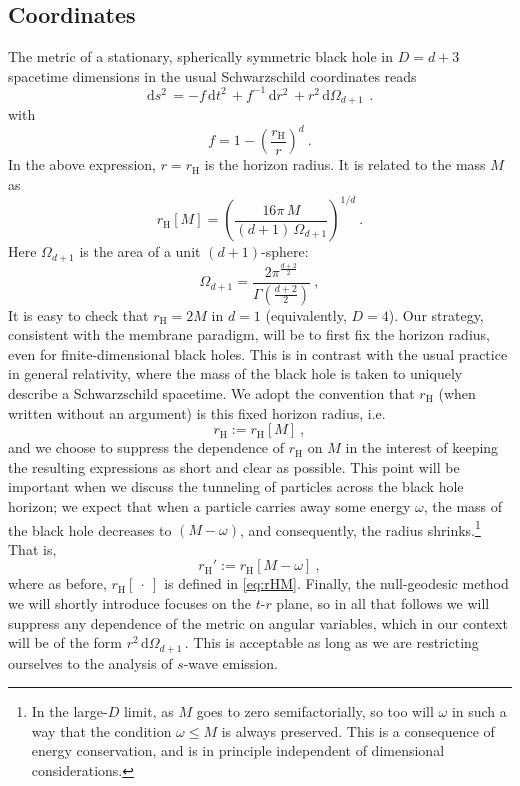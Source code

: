 \documentclass[a4paper,11pt]{article}
\newcommand{\dd}[1]{\text{d}#1 \, }
\newcommand{\rH}{r_{\text{H}}}
\begin{document}
\subsection{Coordinates}
\label{sec:Coord}
The metric of a stationary, spherically symmetric black hole in $D = d+3$ spacetime dimensions in the usual Schwarzschild coordinates \cite{Tangherlini:1963bw} reads
\begin{equation}
\label{eq:SchwarzTang}
\dd{s^2} = -f \,\dd{t^2} + f^{-1} \, \dd{r^2} + r^2 \, \dd{\Omega_{d+1}} \ .
\end{equation}
with
\begin{equation}
f = 1- \left(\frac{r_\text{H}}{r}\right)^{d} \ .
\end{equation}
In the above expression, $r = r_\text{H}$ is the horizon radius. It is related to the mass $M$ as
\begin{equation}
\label{eq:rHM}
r_{\text{H}} [M] = \left( \frac{16\pi\, M}{(d+1)\,\Omega_{d+1}} \right)^{1/d} \ .
\end{equation}
Here $\Omega_{d+1}$ is the area of a unit $(d+1)$-sphere:
\begin{equation}
\label{eq:2SphereArea}
\Omega_{d+1} = \frac{2\pi^{\frac{d+2}{2}}}{\Gamma(\frac{d+2}{2})} \ ,
\end{equation}
It is easy to check that $r_{\text{H}} = 2M$ in $d = 1$ (equivalently, $D = 4$). Our strategy, consistent with the membrane paradigm, will be to first fix the horizon radius, even for finite-dimensional black holes. This is in contrast with the usual practice in general relativity, where the mass of the black hole is taken to uniquely describe a Schwarzschild spacetime. We adopt the convention that $\rH$ (when written without an argument) is this fixed horizon radius, i.e.
\begin{equation}
\rH := \rH[M] \ ,
\end{equation}
and we choose to suppress the dependence of $r_{\text{H}}$ on $M$ in the interest of keeping the resulting expressions as short and clear as possible. This point will be important when we discuss the tunneling of particles across the black hole horizon; we expect that when a particle carries away some energy $\omega$, the mass of the black hole decreases to $(M-\omega)$, and consequently, the radius shrinks.\footnote{In the large-$D$ limit, as $M$ goes to zero semifactorially, so too will $\omega$ in such a way that the condition $\omega \leq M$ is always preserved. This is a consequence of energy conservation, and is in principle independent of dimensional considerations.} That is,
\begin{equation}
\label{eq:rHMOmega}
\rH' := \rH[M-\omega] \ ,
\end{equation}
where as before, $\rH[\ \cdot \ ]$ is defined in \eqref{eq:rHM}. Finally, the null-geodesic method we will shortly introduce focuses on the $t$-$r$ plane, so in all that follows we will suppress any dependence of the metric on angular variables, which in our context will be of the form $r^2 \, \dd{\Omega_{d+1}}$. This is acceptable as long as we are restricting ourselves to the analysis of $s$-wave emission.
\end{document}
